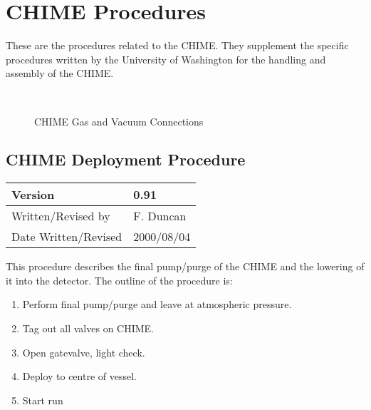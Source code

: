 
\section{CHIME Procedures}

  These are the procedures related to the CHIME.  They supplement
the specific procedures written by the University of Washington for
the handling and assembly of the CHIME.


\begin{figure}
\begin{center}
\leavevmode
\epsfxsize=7in
~\\
\caption[CHIME Gas and Vacuum Connections]
        {CHIME Gas and Vacuum Connections
        } 
        
\end{center}
\end{figure}


\subsection{CHIME Deployment Procedure}
\noindent
\begin{tabular}{|l|l|}
\hline
Version              & 0.91 \\
\hline
Written/Revised by   & F. Duncan \\
\hline
Date Written/Revised & 2000/08/04\\
\hline
\end{tabular}
This procedure describes the final pump/purge of the CHIME and the
lowering of it into the detector.
\noindent 
  The outline of the procedure is:
\begin{enumerate}
\item Perform final pump/purge and leave at atmospheric pressure.
\item Tag out all valves on CHIME.
\item Open gatevalve, light check.
\item Deploy to centre of vessel.
\item Start run
\end{enumerate}
  


